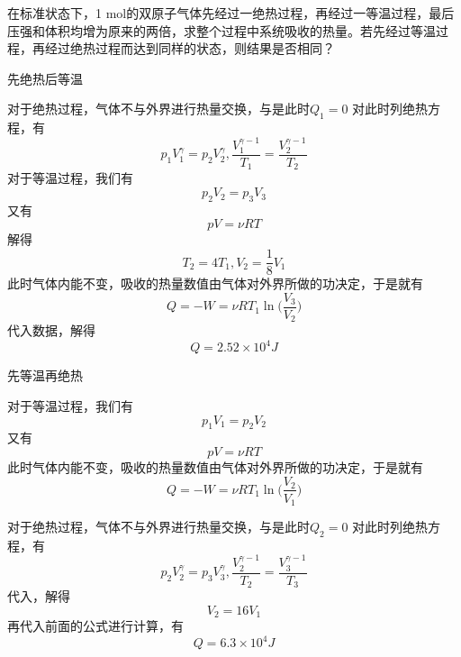 \documentclass[lang=cn,10pt]{elegantbook}
\begin{document}
	\begin{example}
		在标准状态下，1 mol的双原子气体先经过一绝热过程，再经过一等温过程，最后压强和体积均增为原来的两倍，求整个过程中系统吸收的热量。若先经过等温过程，再经过绝热过程而达到同样的状态，则结果是否相同？
	\end{example}
	\begin{solution}
		先绝热后等温
		
		对于绝热过程，气体不与外界进行热量交换，与是此时$Q_{1}=0$
		对此时列绝热方程，有
			\begin{equation*}
			p_{1}V_{1}^{\gamma}=	p_{2}V_{2}^{\gamma},\frac{V_{1}^{\gamma-1}}{T_{1}}=\frac{V_{2}^{\gamma-1}}{T_{2}}
			\end{equation*}
		对于等温过程，我们有
		\begin{equation*}
			p_{2}V_{2}=p_{3}V_{3}
		\end{equation*}
		又有
		\begin{equation*}
			pV=\nu RT
		\end{equation*}
		解得
		\begin{equation*}
			T_{2}=4T_{1},V_{2}=\frac{1}{8}V_{1}
		\end{equation*}
		此时气体内能不变，吸收的热量数值由气体对外界所做的功决定，于是就有
		\begin{equation*}
			Q=-W=\nu RT_{1}\ln\mathrm{(}\frac{V_3}{V_2})
		\end{equation*}
		代入数据，解得
		\begin{equation*}
			Q=2.52\times10^{4}J
		\end{equation*}
		
		先等温再绝热
		
		对于等温过程，我们有
		\begin{equation*}
			p_{1}V_{1}=p_{2}V_{2}
		\end{equation*}
		又有
		\begin{equation*}
			pV=\nu RT
		\end{equation*}
		此时气体内能不变，吸收的热量数值由气体对外界所做的功决定，于是就有
		\begin{equation*}
			Q=-W=\nu RT_{1}\ln\mathrm{(}\frac{V_2}{V_1})
		\end{equation*}
		
		对于绝热过程，气体不与外界进行热量交换，与是此时$Q_{2}=0$
		对此时列绝热方程，有
		\begin{equation*}
			p_{2}V_{2}^{\gamma}=	p_{3}V_{3}^{\gamma},\frac{V_{2}^{\gamma-1}}{T_{2}}=\frac{V_{3}^{\gamma-1}}{T_{3}}
		\end{equation*}
		代入，解得
		\begin{equation*}
			V_{2}=16V_{1}
		\end{equation*}
		再代入前面的公式进行计算，有
		\begin{equation*}
			Q=6.3\times10^{4}J
		\end{equation*}
	\end{solution}
	~\\
	~\\
	
\end{document}
